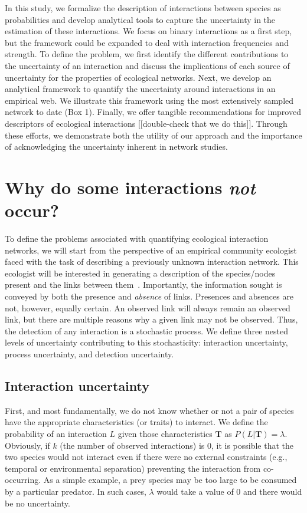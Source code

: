 \documentclass[12pt]{article}
\begin{document}
\begin{spacing}{2.0}
    In this study, we formalize the description of interactions between species as probabilities and develop analytical tools to capture the uncertainty in the estimation of these interactions. We focus on binary interactions as a first step, but the framework could be expanded to deal with interaction frequencies and strength. To define the problem, we first identify the different contributions to the uncertainty of an interaction and discuss the implications of each source of uncertainty for the properties of ecological networks. Next, we develop an analytical framework to quantify the uncertainty around interactions in an empirical web. We illustrate this framework using the most extensively sampled network to date (Box 1).  Finally, we offer tangible recommendations for improved descriptors of ecological interactions [[double-check that we do this]]. Through these efforts, we demonstrate both the utility of our approach and the importance of acknowledging the uncertainty inherent in network studies.


\section*{Why do some interactions \emph{not} occur?}

  To define the problems associated with quantifying ecological interaction networks, we will start from the perspective of an empirical community ecologist faced with the task of describing a previously unknown interaction network. This ecologist will be interested in generating a description of the species/nodes present and the links between them~\citep{Roslin2016}.  Importantly, the information sought is conveyed by both the presence and \emph{absence} of links. Presences and absences are not, however, equally certain. An observed link will always remain an observed link, but there are multiple reasons why a given link may not be observed. Thus, the detection of any interaction is a stochastic process. We define three nested levels of uncertainty contributing to this stochasticity: interaction uncertainty, process uncertainty, and detection uncertainty.

    \subsection*{Interaction uncertainty} 

      First, and most fundamentally, we do not know whether or not a pair of species have the appropriate characteristics (or traits) to interact. We define the probability of an interaction $L$ given those characteristics $\mathbf{T}$ as $P(L | \mathbf{T})=\lambda$. Obviously, if $k$ (the number of observed interactions) is 0, it is possible that the two species would not interact even if there were no external constraints (e.g., temporal or environmental separation) preventing the interaction from co-occurring. As a simple example, a prey species may be too large to be consumed by a particular predator. In such cases, $\lambda$ would take a value of 0 and there would be no uncertainty. 


\end{spacing}
\end{document}
